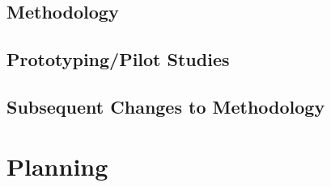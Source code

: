 \documentclass[12pt,a4paper]{article}
\begin{document}
\subsection{Methodology}

\subsection{Prototyping/Pilot Studies}

\subsection{Subsequent Changes to Methodology}

\section{Planning}

\pagebreak


\end{document}
